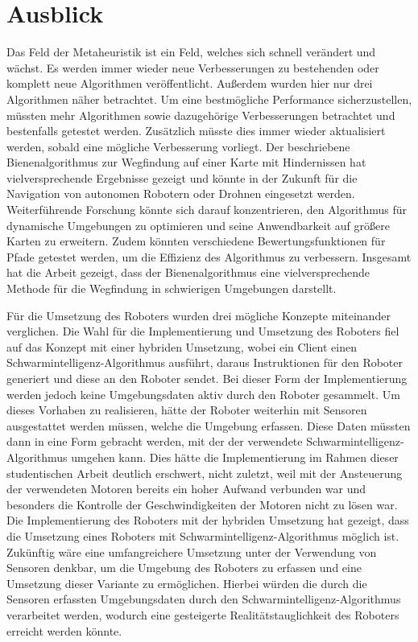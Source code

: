 \label{ch:fazit}
\section{Ausblick}
Das Feld der Metaheuristik ist ein Feld, welches sich schnell verändert und wächst. Es werden immer wieder neue Verbesserungen zu bestehenden oder komplett neue Algorithmen veröffentlicht. Außerdem wurden hier nur drei Algorithmen näher betrachtet. Um eine bestmögliche Performance sicherzustellen, müssten mehr Algorithmen sowie dazugehörige Verbesserungen betrachtet und bestenfalls getestet werden. Zusätzlich müsste dies immer wieder aktualisiert werden, sobald eine mögliche Verbesserung vorliegt.
Der beschriebene Bienenalgorithmus zur Wegfindung auf einer Karte mit Hindernissen hat vielversprechende Ergebnisse gezeigt und könnte in der Zukunft für die Navigation von autonomen Robotern oder Drohnen eingesetzt werden. Weiterführende Forschung könnte sich darauf konzentrieren, den Algorithmus für dynamische Umgebungen zu optimieren und seine Anwendbarkeit auf größere Karten zu erweitern. Zudem könnten verschiedene Bewertungsfunktionen für Pfade getestet werden, um die Effizienz des Algorithmus zu verbessern. Insgesamt hat die Arbeit gezeigt, dass der Bienenalgorithmus eine vielversprechende Methode für die Wegfindung in schwierigen Umgebungen darstellt.

Für die Umsetzung des Roboters wurden drei mögliche Konzepte miteinander verglichen. Die Wahl für die Implementierung und Umsetzung des Roboters fiel auf das Konzept mit einer hybriden Umsetzung, wobei ein Client einen Schwarmintelligenz-Algorithmus ausführt, daraus Instruktionen für den Roboter generiert und diese an den Roboter sendet. Bei dieser Form der Implementierung werden jedoch keine Umgebungsdaten aktiv durch den Roboter gesammelt. Um dieses Vorhaben zu realisieren, hätte der Roboter weiterhin mit Sensoren ausgestattet werden müssen, welche die Umgebung erfassen. Diese Daten müssten dann in eine Form gebracht werden, mit der der verwendete Schwarmintelligenz-Algorithmus umgehen kann. Dies hätte die Implementierung im Rahmen dieser studentischen Arbeit deutlich erschwert, nicht zuletzt, weil mit der Ansteuerung der verwendeten Motoren bereits ein hoher Aufwand verbunden war und besonders die Kontrolle der Geschwindigkeiten der Motoren nicht zu lösen war. Die Implementierung des Roboters mit der hybriden Umsetzung hat gezeigt, dass die Umsetzung eines Roboters mit Schwarmintelligenz-Algorithmus möglich ist. Zukünftig wäre eine umfangreichere Umsetzung unter der Verwendung von Sensoren denkbar, um die Umgebung des Roboters zu erfassen und eine Umsetzung dieser Variante zu ermöglichen. Hierbei würden die durch die Sensoren erfassten Umgebungsdaten durch den Schwarmintelligenz-Algorithmus verarbeitet werden, wodurch eine gesteigerte Realitätstauglichkeit des Roboters erreicht werden könnte.